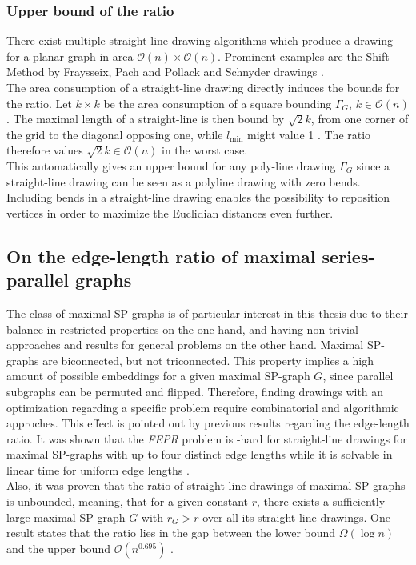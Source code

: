 \subsubsection{Upper bound of the ratio}
There exist multiple straight-line drawing algorithms which produce a drawing for a planar graph in area $\mathcal{O}(n)\times\mathcal{O}(n)$. Prominent examples are the Shift Method by Fraysseix, Pach and Pollack \cite [P. 202ff]{Planar_straight_line_drawing_algorithms} and Schnyder drawings \cite[P. 3]{Schnyder_drawings}.\\
The area consumption of a straight-line drawing directly induces the bounds for the ratio. Let $k\times k$ be the area consumption of a square bounding $\Gamma_G$, $k\in \mathcal{O}(n)$. The maximal length of a straight-line is then bound by $\sqrt{2}k$, from one corner of the grid to the diagonal opposing one, while $l_{\min}$ might value 1 \UL. The ratio therefore values $\sqrt{2}k \in \mathcal{O}(n)$ in the worst case.\\
This automatically gives an upper bound for any poly-line drawing $\Gamma_G$ since a straight-line drawing can be seen as a polyline drawing with zero bends. Including bends in a straight-line drawing enables the possibility to reposition vertices in order to maximize the Euclidian distances even further.


\subsection{On the edge-length ratio of maximal series-parallel graphs}

The class of maximal SP-graphs is of particular interest in this thesis due to their balance in restricted properties on the one hand, and having non-trivial approaches and results for general problems on the other hand. Maximal SP-graphs are biconnected, but not triconnected. This property implies a high amount of possible embeddings for a given maximal SP-graph $G$, since parallel subgraphs can be permuted and flipped. Therefore, finding drawings with an optimization regarding a specific problem require combinatorial and algorithmic approches. This effect is pointed out by previous results regarding the edge-length ratio. It was shown that the \emph{FEPR} problem is \NP-hard for straight-line drawings for maximal SP-graphs with up to four distinct edge lengths while it is solvable in linear time for uniform edge lengths \cite[P. 1]{straight-line_2-trees}.\\
Also, it was proven that the ratio of straight-line drawings of maximal SP-graphs is unbounded, meaning, that for a given constant $r$, there exists a sufficiently large maximal SP-graph $G$ with $r_G > r$ over all its straight-line drawings. One result states that the ratio lies in the gap between the lower bound $\Omega(\log n)$ and the upper bound $\mathcal{O}(n^{0.695})$ \cite[P. 2]{edge-length-ratio-2tree}.

